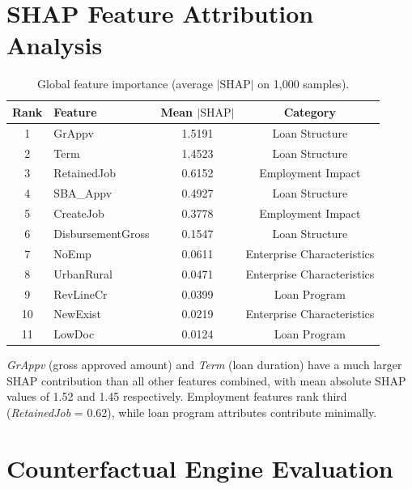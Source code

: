 \documentclass[12pt,a4paper]{report}
\begin{document}
\section{SHAP Feature Attribution Analysis}

\begin{table}[H]
\centering
\caption{Global feature importance (average $|\text{SHAP}|$ on 1,000 samples).}
\label{tab:shap_global_report}
\begin{tabular}{clcc}
\hline
\textbf{Rank} & \textbf{Feature} & \textbf{Mean $|\text{SHAP}|$} & \textbf{Category} \\
\hline
1 & GrAppv & 1.5191 & Loan Structure \\
2 & Term & 1.4523 & Loan Structure \\
3 & RetainedJob & 0.6152 & Employment Impact \\
4 & SBA\_Appv & 0.4927 & Loan Structure \\
5 & CreateJob & 0.3778 & Employment Impact \\
6 & DisbursementGross & 0.1547 & Loan Structure \\
7 & NoEmp & 0.0611 & Enterprise Characteristics \\
8 & UrbanRural & 0.0471 & Enterprise Characteristics \\
9 & RevLineCr & 0.0399 & Loan Program \\
10 & NewExist & 0.0219 & Enterprise Characteristics \\
11 & LowDoc & 0.0124 & Loan Program \\
\hline
\end{tabular}
\end{table}

\textit{GrAppv} (gross approved amount) and \textit{Term} (loan duration) have a much larger SHAP contribution than all other features combined, with mean absolute SHAP values of 1.52 and 1.45 respectively. Employment features rank third (\textit{RetainedJob} = 0.62), while loan program attributes contribute minimally.

\section{Counterfactual Engine Evaluation}
\end{document}
